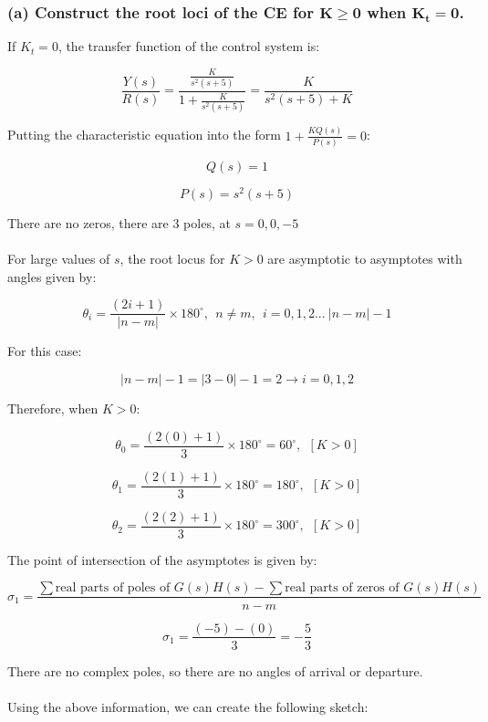 \documentclass[12pt, letterpaper]{../assignment}
\begin{document}
\subsubsection*{(a) Construct the root loci of the CE for $\mathbf{K \ge 0}$ when $\mathbf{K_t=0}$.}

If $K_t = 0$, the transfer function of the control system is:

$$ \frac{Y(s)}{R(s)} = \frac{\frac{K}{s^2 (s+5)}}{1 + \frac{K}{s^2 (s+5)}} = \frac{K}{s^2 (s+5) + K} $$

Putting the characteristic equation into the form $ 1 + \frac{K Q(s)}{P(s)} = 0 $:

$$ Q(s) = 1 $$

$$ P(s) = s^2 (s+5) $$

There are no zeros, there are 3 poles, at $s = 0, 0, -5$
\\\\
For large values of $s$, the root locus for $K > 0$ are asymptotic to asymptotes with angles
given by:

$$ \theta_i = \frac{(2i+1)}{|n-m|} \times 180^{\circ}, \ \ n \neq m, \ \ i = 0,1,2... \ |n-m|-1$$

For this case:

$$ |n-m|-1 = |3-0|-1 = 2 \rightarrow i = 0,1,2 $$

Therefore, when $K > 0$:
\begin{answer}
    $$ \theta_0 = \frac{(2(0)+1)}{3} \times 180^{\circ} = 60^{\circ}, \ \ [K > 0] $$
\end{answer}


\begin{answer}
    $$ \theta_1 = \frac{(2(1)+1)}{3} \times 180^{\circ} = 180^{\circ}, \ \ [K > 0] $$
\end{answer}


\begin{answer}
    $$ \theta_2 = \frac{(2(2)+1)}{3} \times 180^{\circ} = 300^{\circ}, \ \ [K > 0] $$
\end{answer}

The point of intersection of the asymptotes is given by:

$$ \sigma_1 = \frac{\sum \text{real parts of poles of } G(s)H(s) - \sum \text{real parts of zeros of } G(s)H(s) }{n-m} $$

$$ \sigma_1 = \frac{(-5) - (0) }{3} = -\frac{5}{3} $$

There are no complex poles, so there are no angles of arrival or departure.
\\\\
Using the above information, we can create the following sketch:
\end{document}
